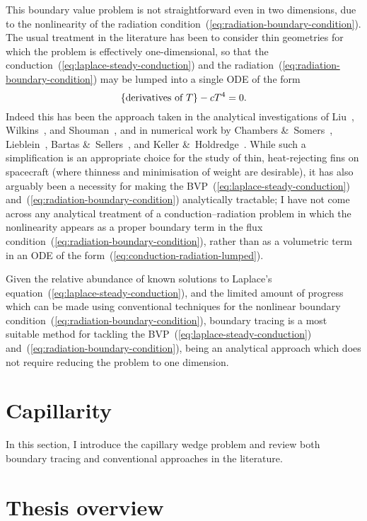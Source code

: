 This boundary value problem is not straightforward
even in two dimensions,
due to the nonlinearity of
the radiation condition~(\ref{eq:radiation-boundary-condition}).
The usual treatment in the literature has been to consider thin geometries
for which the problem is effectively one-dimensional,
so that the conduction~(\ref{eq:laplace-steady-conduction})
and the radiation~(\ref{eq:radiation-boundary-condition})
may be lumped into a single ODE of the form
\begin{equation}
  \left\{\text{derivatives of~$T$}\right\} - c T^4 = 0.
  \label{eq:conduction-radiation-lumped}
\end{equation}
Indeed this has been the approach taken in the analytical investigations of
Liu~\cite{liu-1960-minimum-rectangular-radiating-fins},
Wilkins~\cite{
  wilkins-1960-minumum-mass-fins-radiation,
  wilkins-1961-minimum-mass-fins-thickness,
  wilkins-1962-minimum-mass-fins-gradients,
  wilkins-1974-optimum-shapes-convection-radiation
},
and
Shouman~\cite{shouman-1968-exact-radiation-convection-fin},
and in numerical work by
Chambers \&~Somers~\cite{chambers-1959-radiation-fin-efficiency-circular},
Lieblein~\cite{lieblein-1959-radiant-fin-constant-thickness},
Bartas \&~Sellers~\cite{bartas-1960-radiation-fin-effectiveness},
and
Keller \&~Holdredge~\cite{keller-1970-radiation-annular-fins-trapezoidal}.
While such a simplification is an appropriate choice
for the study of thin, heat-rejecting fins on spacecraft
(where thinness and minimisation of weight are desirable),
it has also arguably been a necessity
for making the BVP~(\ref{eq:laplace-steady-conduction})
and~(\ref{eq:radiation-boundary-condition}) analytically tractable;
I have not come across any analytical treatment
of a conduction--radiation problem
in which the nonlinearity appears as a proper boundary term
in the flux condition~(\ref{eq:radiation-boundary-condition}),
rather than as a volumetric term in an ODE
of the form~(\ref{eq:conduction-radiation-lumped}).

Given the relative abundance of known solutions
to Laplace's equation~(\ref{eq:laplace-steady-conduction}),
and the limited amount of progress which can be made
using conventional techniques
for the nonlinear boundary condition~(\ref{eq:radiation-boundary-condition}),
boundary tracing is a most suitable method
for tackling the BVP~(\ref{eq:laplace-steady-conduction})
and~(\ref{eq:radiation-boundary-condition}),
being an analytical approach
which does not require reducing the problem to one dimension.

\section{Capillarity}
\label{sec:introduction.capillarity}

In this section,
I introduce the capillary wedge problem
and review both boundary tracing and conventional approaches
in the literature.

\section{Thesis overview}
